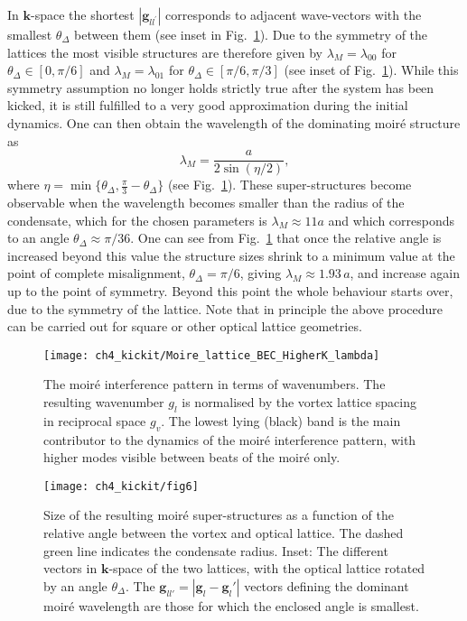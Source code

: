     In $\mathbf{k}$-space the shortest $|\mathbf{g}_{ll^\prime}|$ corresponds to adjacent wave-vectors with the smallest $\theta_\Delta$ between them (see inset in Fig.~\ref{fig:moire_lambda_1}). Due to the symmetry of the lattices the most visible structures are therefore given by $\lambda_M=\lambda_{00}$ for $\theta_\Delta\in[0,\pi/6]$ and $\lambda_M=\lambda_{01}$ for $\theta_\Delta\in[\pi/6,\pi/3]$ (see inset of Fig.~\ref{fig:moire_lambda_1}).
    While this symmetry assumption no longer holds strictly true after the system has been kicked, it is still fulfilled to a very good approximation during the initial dynamics. One can then obtain the wavelength of the dominating moir\'e structure as~\cite{jns-moire,nphys2272}
    		\begin{equation}
    		\lambda_M = \frac{a}{2\sin(\eta/2)},
    		\label{eqn:moire_size}
    	\end{equation}
    where $\eta=\min\{\theta_\Delta,\frac{\pi}{3} - \theta_\Delta \} $  (see Fig.~\ref{fig:moire_lambda_1}).
These super-structures become observable when the wavelength becomes smaller than the radius of the condensate, which for the chosen parameters is $\lambda_M \approx 11a$ and which corresponds to an angle $\theta_\Delta \approx \pi/36$.
One can see from Fig.~\ref{fig:moire_lambda_1} that once the relative angle is increased beyond this value the structure sizes shrink to a minimum value at the point of complete misalignment, $\theta_\Delta=\pi/6$, giving $\lambda_M\approx 1.93\,a$, and increase again up to the point of symmetry. Beyond this point the whole behaviour starts over, due to the symmetry of the lattice. Note that in principle the above procedure can be carried out for square or other optical lattice geometries.

\begin{figure}
    \centering

	\texttt{[image: ch4\_kickit/Moire\_lattice\_BEC\_HigherK\_lambda]}
    \caption{The moir\'e interference pattern in terms of wavenumbers. The resulting wavenumber $g_l$ is normalised by the vortex lattice spacing in reciprocal space $g_v$. The lowest lying (black) band is the main contributor to the dynamics of the moir\'e interference pattern, with higher modes visible between beats of the moir\'e only.}
\end{figure}



\begin{figure}[tb]
    \centering

	\texttt{[image: ch4\_kickit/fig6]}
	\caption{Size of the resulting moir\'e super-structures as a function of the relative angle between the vortex and optical lattice. The dashed green line indicates the condensate radius. Inset: The different vectors in $\mathbf{k}$-space of the two lattices, with the optical lattice rotated by an angle $\theta_\Delta$. The $\mathbf{g}_{ll'} = |\mathbf{g}_l - \mathbf{g}_l'|$ vectors defining the dominant moir\'e wavelength are those for which the enclosed angle is smallest. }
	\label{fig:moire_lambda_1}
\end{figure}

